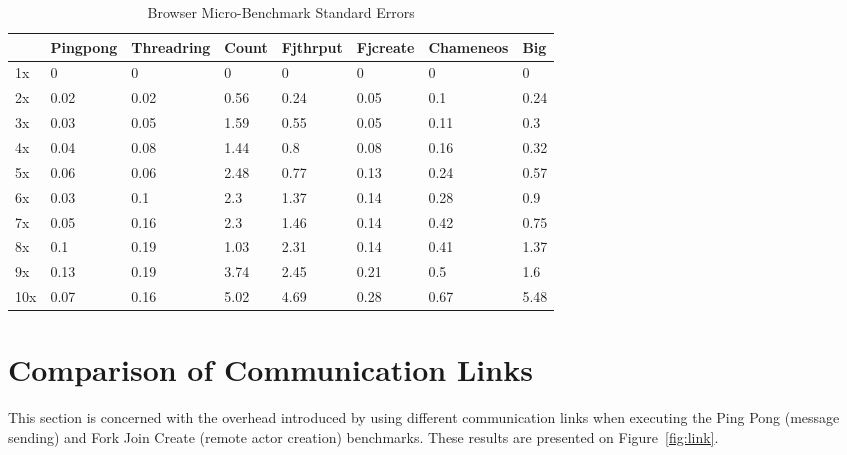 \documentclass[oneside]{um-fict}
\begin{document}
\begin{table}[H]
    \begin{center}
        \begin{tabular}{|l|lllllll|}
        \hline
        & Pingpong & Threadring & Count & Fjthrput & Fjcreate & Chameneos & Big  \\ \hline
        1x  & 0        & 0          & 0     & 0        & 0        & 0         & 0    \\
        2x  & 0.02     & 0.02       & 0.56  & 0.24     & 0.05     & 0.1       & 0.24 \\
        3x  & 0.03     & 0.05       & 1.59  & 0.55     & 0.05     & 0.11      & 0.3  \\
        4x  & 0.04     & 0.08       & 1.44  & 0.8      & 0.08     & 0.16      & 0.32 \\
        5x  & 0.06     & 0.06       & 2.48  & 0.77     & 0.13     & 0.24      & 0.57 \\
        6x  & 0.03     & 0.1        & 2.3   & 1.37     & 0.14     & 0.28      & 0.9  \\
        7x  & 0.05     & 0.16       & 2.3   & 1.46     & 0.14     & 0.42      & 0.75 \\
        8x  & 0.1      & 0.19       & 1.03  & 2.31     & 0.14     & 0.41      & 1.37 \\
        9x  & 0.13     & 0.19       & 3.74  & 2.45     & 0.21     & 0.5       & 1.6  \\
        10x & 0.07     & 0.16       & 5.02  & 4.69     & 0.28     & 0.67      & 5.48 \\ \hline
        \end{tabular}
        \caption{Browser Micro-Benchmark Standard Errors}\label{tab:browserloadscalingsem}
    \end{center}
\end{table}
\section{Comparison of Communication Links}
This section is concerned with the overhead introduced by using different communication links when executing the Ping Pong (message sending) and Fork Join Create (remote actor creation) benchmarks. These results are presented on Figure~\ref{fig:link}.
\end{document}
